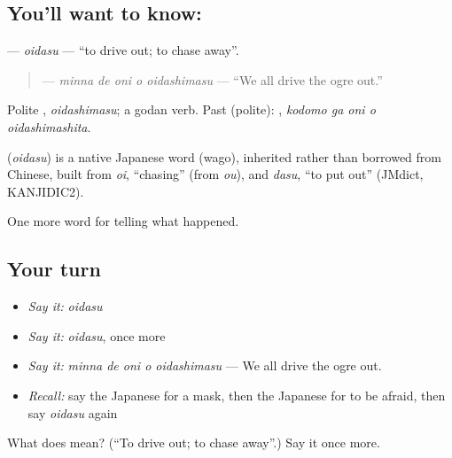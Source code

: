 \subsection*{You'll want to know: }
\textbf{} — \emph{oidasu} — \textquotedblleft{}to drive out; to chase away\textquotedblright{}.

\begin{quote}
\textbf{  } — \emph{minna de oni o oidashimasu} — \textquotedblleft{}We all drive the ogre out.\textquotedblright{}
\end{quote}

Polite \textbf{}, \emph{oidashimasu}; a godan verb. Past (polite): \textbf{  }, \emph{kodomo ga oni o oidashimashita}.

\begin{cousinweb}
\textbf{} (\emph{oidasu}) is a native Japanese word (wago), inherited rather than borrowed from Chinese, built from \emph{oi}, \textquotedblleft{}chasing\textquotedblright{} (from \emph{ou}), and \emph{dasu}, \textquotedblleft{}to put out\textquotedblright{} (JMdict, KANJIDIC2).
\end{cousinweb}

\begin{grammarlens}[title={What you've built}]
One more word for telling what happened.
\end{grammarlens}

\subsection*{Your turn}
\begin{itemize}
\raggedright
  \item \emph{Say it:} \emph{oidasu}
  \item \emph{Say it:} \emph{oidasu}, once more
  \item \emph{Say it:} \emph{minna de oni o oidashimasu} — We all drive the ogre out.
  \item \emph{Recall:} say the Japanese for a mask, then the Japanese for to be afraid, then say \emph{oidasu} again
\end{itemize}

\begin{tcolorbox}[breakable,colback=teal!4,colframe=teal!35!black,title={Before you move on}]
What does  mean? (\textquotedblleft{}To drive out; to chase away\textquotedblright{}.) Say it once more.
\end{tcolorbox}
